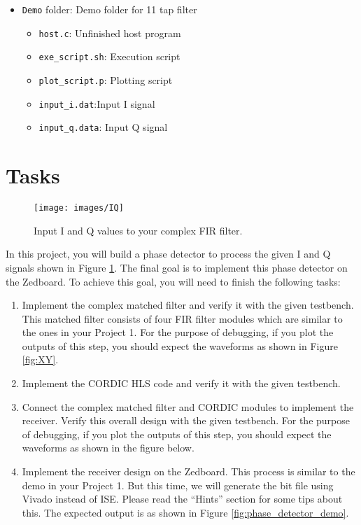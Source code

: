 \begin{itemize}
\item \texttt{Demo} folder: Demo folder for 11 tap filter
\begin{itemize}
\item \texttt{host.c}: Unfinished host program
\item \texttt{exe\_script.sh}: Execution script
\item \texttt{plot\_script.p}: Plotting script
\item \texttt{input\_i.dat}:Input I signal
\item \texttt{input\_q.data}: Input Q signal

\end{itemize}
\end{itemize}

\section{Tasks}

\begin{figure}
\centering
%
\texttt{[image: images/IQ]}
\caption{Input I and Q values to your complex FIR filter.} \label{fig:IQ}
\end{figure}

In this project, you will build a phase detector to process the given I and Q signals shown in Figure \ref{fig:IQ}. The final goal is to implement this phase detector on the Zedboard. To achieve this goal, you will need to finish the following 
tasks:
\begin{enumerate}
\item Implement the complex matched filter and verify it with the given testbench. This matched filter consists of four FIR filter modules which are similar to the ones in your Project 1. For the purpose of debugging, if you plot the outputs of this step, you should expect the waveforms as shown in Figure \ref{fig:XY}.
\item Implement the CORDIC HLS code and verify it with the given testbench.
\item Connect the complex matched filter and CORDIC modules to implement the receiver. Verify this overall design with the given testbench. For the purpose of debugging, if you plot the outputs of this step, you should expect the waveforms as shown in the figure below.
\item Implement the receiver design on the Zedboard. This process is similar to the demo in your Project 1. But this time, we will generate the bit file using Vivado instead of ISE. Please read the ``Hints'' section for some tips about this. The expected output is as shown in Figure \ref{fig:phase_detector_demo}.
\end{enumerate}

